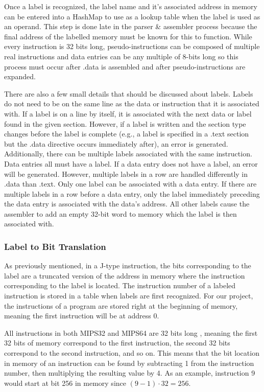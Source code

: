 \documentclass[
    paper=letter,
    parskip=half,
    fontsize=12pt,
    titlepage=firstiscover,
    toc=bibliography,
    numbers=endperiod
]{scrartcl}
\begin{document}
Once a label is recognized, the label name and it's associated address
in memory can be entered into a HashMap to use as a lookup table when
the label is used as an operand. This step is done late in the parser \&
assembler process because the final address of the labelled memory must
be known for this to function. While every instruction is 32 bits long,
pseudo-instructions can be composed of multiple real instructions and
data entries can be any multiple of 8-bits long so this process must
occur after .data is assembled and after pseudo-instructions are
expanded.

There are also a few small details that should be discussed about
labels. Labels do not need to be on the same line as the data or
instruction that it is associated with. If a label is on a line by
itself, it is associated with the next data or label found in the given
section. However, if a label is written and the section type changes
before the label is complete (e.g., a label is specified in a .text
section but the .data directive occurs immediately after), an error is
generated. Additionally, there can be multiple labels associated with
the same instruction. Data entries all must have a label. If a data
entry does not have a label, an error will be generated. However,
multiple labels in a row are handled differently in .data than .text.
Only one label can be associated with a data entry. If there are
multiple labels in a row before a data entry, only the label immediately
preceding the data entry is associated with the data's address. All
other labels cause the assembler to add an empty 32-bit word to memory
which the label is then associated with.

\subsubsection{Label to Bit Translation}

As previously mentioned, in a J-type instruction, the bits corresponding
to the label are a truncated version of the address in memory where the
instruction corresponding to the label is located. The instruction
number of a labeled instruction is stored in a table when labels are
first recognized. For our project, the instructions of a program are
stored right at the beginning of memory, meaning the first instruction
will be at address 0.

All instructions in both MIPS32 and MIPS64 are 32 bits long
\cite{brady-instruction-formats}, meaning the first 32 bits of memory
correspond to the first instruction, the second 32 bits correspond to
the second instruction, and so on. This means that the bit location in
memory of an instruction can be found by subtracting 1 from the
instruction number, then multiplying the resulting value by 4. As an
example, instruction 9 would start at bit 256 in memory since $(9 - 1)
    \cdot 32 = 256$.
\end{document}
